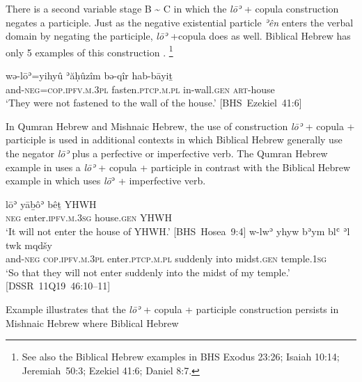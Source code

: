 \documentclass[output=paper,colorlinks,citecolor=brown,draft,draftmode]{langscibook}
\begin{document}
There is a second variable stage B {\textasciitilde} C in which the
\textit{lōʾ} + copula construction negates a participle. Just as the
negative existential particle \textit{ʾên} enters the verbal domain by
negating the participle, \textit{lōʾ} +copula does as well. Biblical Hebrew
has only 5 examples of this construction .%
%
    \footnote{See also the Biblical Hebrew examples in BHS Exodus 23:26; Isaiah
    10:14; Jeremiah~50:3; Ezekiel 41:6; Daniel 8:7.} 
%
\begin{exe}\ex \label{ex:heb-fastened}
    \gll wə-lōʾ=yihyû ʾăḥûzîm bə-qîr hab-bāyiṯ \\
  and-\textsc{neg}=\textsc{cop.ipfv.m.3pl} fasten.\textsc{ptcp.m.pl}   in-wall.\textsc{gen}   \textsc{art}-house \\
    \glt `They were not fastened to the wall of the house.'
    \mbox{[BHS Ezekiel 41:6]}
    \end{exe}
%
In Qumran Hebrew and Mishnaic Hebrew, the use of construction \textit{lōʾ}
+ copula + participle is used in additional contexts in which Biblical
Hebrew generally use the negator \textit{lōʾ} plus a perfective or
imperfective verb. The Qumran Hebrew example in  uses a
\textit{lōʾ} + copula + participle in contrast with the Biblical Hebrew example
in  which uses \textit{lō}ʾ + imperfective verb.
%
\begin{exe}\ex\begin{xlist}
\ex\label{ex:heb-enter-house}
\gll lōʾ yāḇôʾ bêṯ YHWH\\
\textsc{neg} enter.\textsc{ipfv.m.3sg} house.\textsc{gen} YHWH \\
\glt `It will not enter the house of YHWH.' \mbox{[BHS
Hosea 9:4]}
%
\ex\label{ex:heb-enter-temple}
\gll w-lwʾ yhyw bʾym blʿ ʾl twk mqdšy \\
and-\textsc{neg} \textsc{cop.ipfv.m.3pl} enter.\textsc{ptcp.m.pl} suddenly 
into midst.\textsc{gen} temple.\textsc{1sg} \\
\glt `So that they will not enter suddenly into the midst of my temple.' \\
\mbox{[DSSR 11Q19 46:10--11]}
\end{xlist}\end{exe}
%
Example  illustrates that the \textit{lōʾ} + copula
+ participle construction persists in Mishnaic Hebrew where Biblical Hebrew
\end{document}
